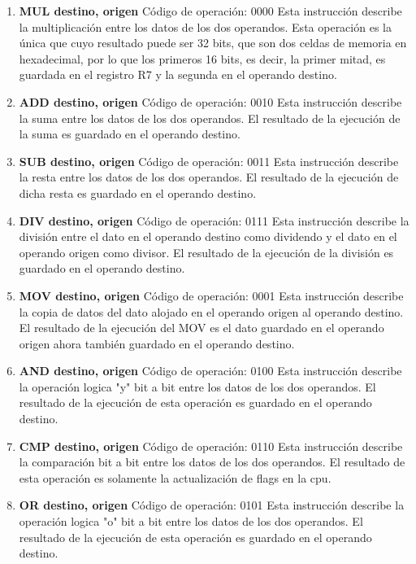 \begin{enumerate}
\item \textbf{MUL destino, origen}
Código de operación: 0000
Esta instrucción describe la multiplicación entre los datos de los dos operandos. Esta operación es la única que cuyo resultado puede ser 32 bits, que son dos celdas de memoria en hexadecimal, por lo que los primeros 16 bits, es decir, la primer mitad, es guardada en el registro R7 y la segunda en el operando destino.
 
\item \textbf{ADD destino, origen}
Código de operación: 0010
Esta instrucción describe la suma entre los datos de los dos operandos. El resultado de la ejecución de la suma es guardado en el operando destino.

\item \textbf{SUB destino, origen}
Código de operación: 0011
Esta instrucción describe la resta entre los datos de los dos operandos. El resultado de la ejecución de dicha resta es guardado en el operando destino.

\item \textbf{DIV destino, origen}
Código de operación: 0111
Esta instrucción describe la división entre el dato en el operando destino como dividendo y el dato en el operando origen como divisor. El resultado de la ejecución de la división es guardado en el operando destino.

\item \textbf{MOV destino, origen}
Código de operación: 0001
Esta instrucción describe la copia de datos del dato alojado en el operando origen al operando destino. El resultado de la ejecución del MOV es el dato guardado en el operando origen ahora también guardado en el operando destino.

\item \textbf{AND destino, origen}
Código de operación: 0100
Esta instrucción describe la operación logica "y" bit a bit entre los datos de los dos operandos. El resultado de la ejecución de esta operación es guardado en el operando destino.

\item \textbf{CMP destino, origen}
Código de operación: 0110
Esta instrucción describe la comparación bit a bit entre los datos de los dos operandos. El resultado de esta operación es solamente la actualización de flags en la cpu.

\item \textbf{OR destino, origen}
Código de operación: 0101
Esta instrucción describe la operación logica "o" bit a bit entre los datos de los dos operandos. El resultado de la ejecución de esta operación es guardado en el operando destino.
\end{enumerate}

